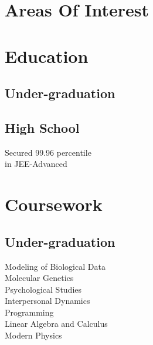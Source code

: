 \documentclass[]{deedy-resume-openfont}
\begin{document}
%
%

%
%



%
%

\begin{minipage}[t]{0.33\textwidth} 


\section{Areas Of Interest} 


\sectionsep

\section{Education} 

\subsection{Under-graduation}
\sectionsep


\subsection{High School}
Secured 99.96 percentile\\
in JEE-Advanced\\

\sectionsep



\section{Coursework}
\subsection{Under-graduation}
Modeling of Biological Data\\
Molecular Genetics \\
Psychological Studies \\
Interpersonal Dynamics\\
Programming \\
Linear Algebra and Calculus \\
Modern Physics\\
\sectionsep



\end{minipage}
\end{document}
